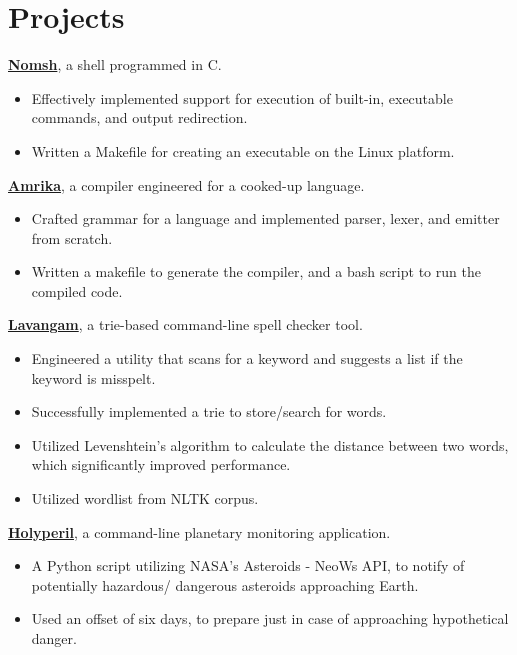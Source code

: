 \documentclass{article}
\begin{document}
\section*{Projects}
\href{https://github.com/rcreddyn/nomsh}{\textbf{Nomsh}}, a shell programmed in C.
\begin{itemize}
\item Effectively implemented support for execution of built-in, executable commands, and output redirection.
\item Written a Makefile for creating an executable on the Linux platform.
\end{itemize}
\href{https://github.com/rcreddyn/nomsh}{\textbf{Amrika}}, a compiler engineered for a cooked-up language.
\begin{itemize}
\item Crafted grammar for a language and implemented parser, lexer, and emitter from scratch.
\item Written a makefile to generate the compiler, and a bash script to run the compiled code.
\end{itemize}
\href{https://github.com/rcreddyn/nomsh}{\textbf{Lavangam}}, a trie-based command-line spell checker tool.
\begin{itemize}
\item Engineered a utility that scans for a keyword and suggests a list if the keyword is misspelt.
\item Successfully implemented a trie to store/search for words.
\item Utilized Levenshtein's algorithm to calculate the distance between two words, which significantly improved performance.
\item Utilized wordlist from NLTK corpus.
\end{itemize}
\href{https://github.com/rcreddyn/nomsh}{\textbf{Holyperil}}, a command-line planetary monitoring application.
\begin{itemize}
\item A Python script utilizing NASA's Asteroids - NeoWs API, to notify of potentially hazardous/ dangerous asteroids approaching Earth.
\item Used an offset of six days, to prepare just in case of approaching hypothetical danger.
\end{itemize}
\end{document}
